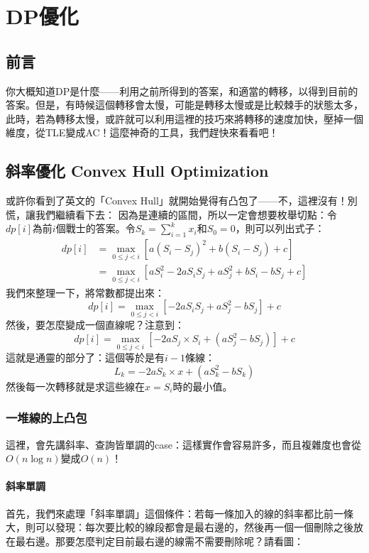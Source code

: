 \chapter{DP優化}
	\section{前言}
		你大概知道DP是什麼——利用之前所得到的答案，和適當的轉移，以得到目前的答案。但是，有時候這個轉移會太慢，可能是轉移太慢或是比較棘手的狀態太多，此時，若為轉移太慢，或許就可以利用這裡的技巧來將轉移的速度加快，壓掉一個維度，從TLE變成AC！這麼神奇的工具，我們趕快來看看吧！
	\section{斜率優化 Convex Hull Optimization}
		或許你看到了英文的「Convex Hull」就開始覺得有凸包了——不，這裡沒有！別慌，讓我們繼續看下去：
		因為是連續的區間，所以一定會想要枚舉切點：令$dp[i]$為前$i$個戰士的答案。令$S_k = \sum^{k}_{i =1 } x_i$和$S_0 = 0$，則可以列出式子：
		\begin{align*}
			dp[i] &= \max_{0 \leq j < i}[a(S_i - S_{j})^2 + b(S_i - S_{j}) + c]\\
			&= \max_{0 \leq j < i}[aS_i^2 - 2aS_iS_j  + aS_j^2 + bS_i - bS_j + c]
		\end{align*}
		我們來整理一下，將常數都提出來：
		$$dp[i] = \max_{0 \leq j < i}[ - 2aS_iS_j  + aS_j^2  - bS_j] + c$$
		然後，要怎麼變成一個直線呢？注意到：
		$$dp[i] = \max_{0 \leq j < i}[ - 2aS_j \times S_i  + (aS_j^2  - bS_j)] + c$$
		這就是通靈的部分了：這個等於是有$i - 1$條線：
		$$L_k = -2aS_k\times x + (aS_k^2 - bS_k)$$
		然後每一次轉移就是求這些線在$x = S_i$時的最小值。
	\subsection{一堆線的上凸包}
		這裡，會先講斜率、查詢皆單調的case：這樣實作會容易許多，而且複雜度也會從$O(n \log n)$變成$O(n)$！
		\subsubsection{斜率單調}
			首先，我們來處理「斜率單調」這個條件：若每一條加入的線的斜率都比前一條大，則可以發現：每次要比較的線段都會是最右邊的，然後再一個一個刪除之後放在最右邊。那要怎麼判定目前最右邊的線需不需要刪除呢？請看圖：
			

